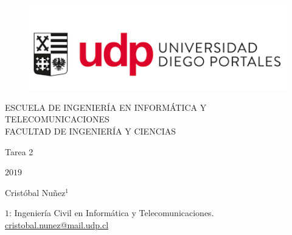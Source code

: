 \documentclass[Article, letterpaper,12pt]{article}
\author{totito del boom}
\begin{document}
\sloppy

\begin{titlepage}

\begin{center}
\vspace*{-1in}
\begin{figure}[htb]
\begin{center}
\includegraphics[width=15cm]{udplogo.png}
\end{center}
\end{figure}


ESCUELA DE INGENIERÍA EN INFORMÁTICA Y TELECOMUNICACIONES\\
\vspace*{0.25in}
FACULTAD DE INGENIERÍA Y CIENCIAS\\
\vspace*{0.25in}

\vspace*{0.3in}
\begin{large}
\begin{Huge}
 Tarea 2
\end{Huge}
\vspace{10pt}
   
\end{large}

\vspace*{0.4in}
\begin{large}
\begin{center}
\begin{huge}
$2019$
\end{huge}
\end{center}
\end{large}
\vspace*{0.4in}
\begin{large}
 Cristóbal Nuñez$^1$
\\
\begin{small}
$1$: Ingeniería Civil en Informática y Telecomunicaciones.\\



{\color{blue}
\href{mailto:cristobal.nunez@mail.udp.cl}{cristobal.nunez@mail.udp.cl}\\

}
\end{small}
\end{large}
\end{center}
\end{titlepage}
\end{document}
